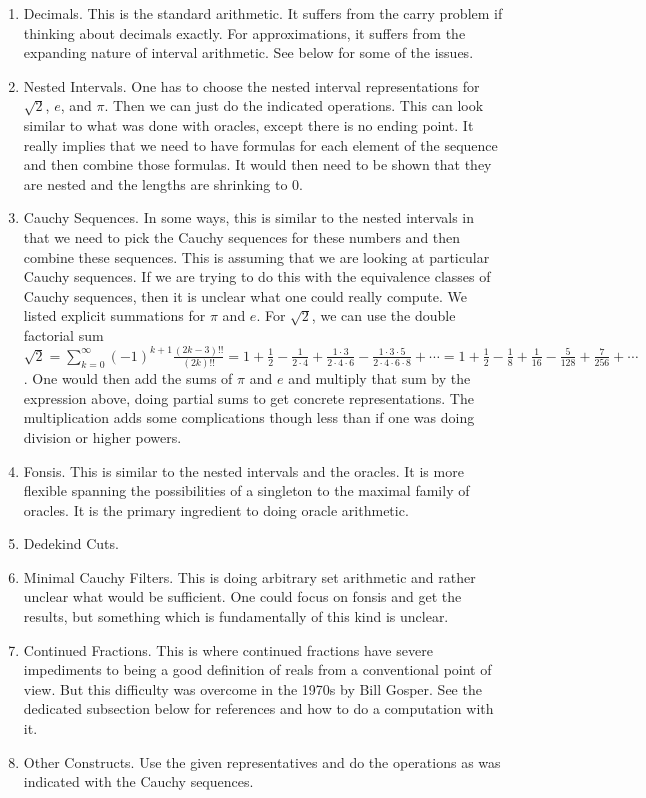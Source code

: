 \documentclass[12pt]{article}
\theoremstyle{remark}
\begin{document}
\begin{enumerate}
\item Decimals. This is the standard arithmetic. It suffers from the carry problem if thinking about decimals exactly. For approximations, it suffers from the expanding nature of interval arithmetic. See below for some of the issues. 
\item Nested Intervals. One has to choose the nested interval representations for $\sqrt{2}$, $e$, and $\pi$. Then we can just do the indicated operations. This can look similar to what was done with oracles, except there is no ending point. It really implies that we need to have formulas for each element of the sequence and then combine those formulas. It would then need to be shown that they are nested and the lengths are shrinking to 0. 
\item Cauchy Sequences. In some ways, this is similar to the nested intervals in that we need to pick the Cauchy sequences for these numbers and then combine these sequences. This is assuming that we are looking at particular Cauchy sequences. If we are trying to do this with the equivalence classes of Cauchy sequences, then it is unclear what one could really compute. We listed explicit summations for $\pi$ and $e$. For $\sqrt{2}$, we can use the double factorial sum $\sqrt{2} = \sum_{k=0}^\infty (-1)^{k+1} \frac{(2k-3)!!}{(2k)!!} =
1 + \frac{1}{2} - \frac{1}{2\cdot4} + \frac{1\cdot3}{2\cdot4\cdot6} - \frac{1\cdot3\cdot5}{2\cdot4\cdot6\cdot8} + \cdots = 1 + \frac{1}{2} - \frac{1}{8} + \frac{1}{16} - \frac{5}{128} + \frac{7}{256} + \cdots$. One would then add the sums of $\pi$ and $e$ and multiply that sum by the expression above, doing partial sums to get concrete representations. The multiplication adds some complications though less than if one was doing division or higher powers. 
\item Fonsis. This is similar to the nested intervals and the oracles. It is more flexible spanning the possibilities of a singleton to the maximal family of oracles. It is the primary ingredient to doing oracle arithmetic. 
\item Dedekind Cuts. 
\item Minimal Cauchy Filters. This is doing arbitrary set arithmetic and rather unclear what would be sufficient. One could focus on fonsis and get the results, but something which is fundamentally of this kind is unclear. 
\item Continued Fractions. This is where continued fractions have severe impediments to being a good definition of reals from a conventional point of view. But this difficulty was overcome in the 1970s by Bill Gosper. See the dedicated subsection below for references and how to do a computation with it. 
\item Other Constructs. Use the given representatives and do the operations as was indicated with the Cauchy sequences. 
\end{enumerate}
\end{document}
